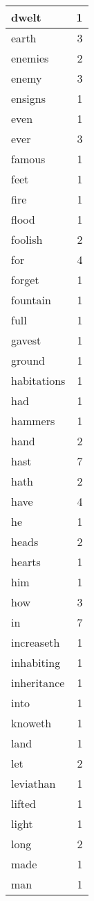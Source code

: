 \begin{center}
\begin{longtable}{l|r}
dwelt & 1 \\ \hline
earth & 3 \\ \hline
enemies & 2 \\ \hline
enemy & 3 \\ \hline
ensigns & 1 \\ \hline
even & 1 \\ \hline
ever & 3 \\ \hline
famous & 1 \\ \hline
feet & 1 \\ \hline
fire & 1 \\ \hline
flood & 1 \\ \hline
foolish & 2 \\ \hline
for & 4 \\ \hline
forget & 1 \\ \hline
fountain & 1 \\ \hline
full & 1 \\ \hline
gavest & 1 \\ \hline
ground & 1 \\ \hline
habitations & 1 \\ \hline
had & 1 \\ \hline
hammers & 1 \\ \hline
hand & 2 \\ \hline
hast & 7 \\ \hline
hath & 2 \\ \hline
have & 4 \\ \hline
he & 1 \\ \hline
heads & 2 \\ \hline
hearts & 1 \\ \hline
him & 1 \\ \hline
how & 3 \\ \hline
in & 7 \\ \hline
increaseth & 1 \\ \hline
inhabiting & 1 \\ \hline
inheritance & 1 \\ \hline
into & 1 \\ \hline
knoweth & 1 \\ \hline
land & 1 \\ \hline
let & 2 \\ \hline
leviathan & 1 \\ \hline
lifted & 1 \\ \hline
light & 1 \\ \hline
long & 2 \\ \hline
made & 1 \\ \hline
man & 1 \\ \hline

\end{longtable}
\end{center}
